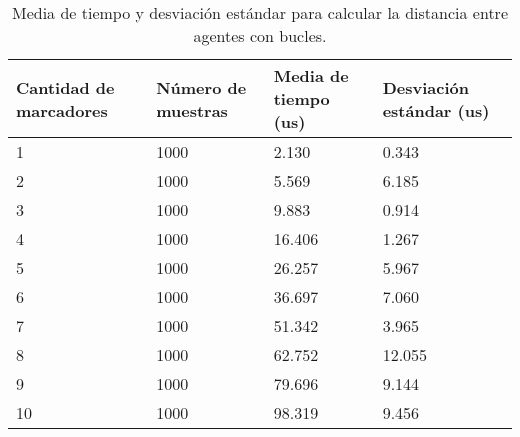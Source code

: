 \begin{table}[H]
	\centering
	\resizebox{\textwidth}{!} {
	\begin{tabular}{|l|l|l|l|}
		\hline
		\textbf{Cantidad de marcadores} & \textbf{Número de muestras} & \textbf{Media de tiempo (us)} & \textbf{Desviación estándar (us)} \\ \hline
		1                               & 1000                        & 2.130                         & 0.343                             \\ \hline
		2                               & 1000                        & 5.569                         & 6.185                             \\ \hline
		3                               & 1000                        & 9.883                         & 0.914                             \\ \hline
		4                               & 1000                        & 16.406                        & 1.267                             \\ \hline
		5                               & 1000                        & 26.257                        & 5.967                             \\ \hline
		6                               & 1000                        & 36.697                        & 7.060                             \\ \hline
		7                               & 1000                        & 51.342                        & 3.965                             \\ \hline
		8                               & 1000                        & 62.752                        & 12.055                            \\ \hline
		9                               & 1000                        & 79.696                        & 9.144                             \\ \hline
		10                              & 1000                        & 98.319                        & 9.456                             \\ \hline
	\end{tabular}}
	\caption{Media de tiempo y desviación estándar para calcular la distancia entre agentes con bucles.}
	\label{cuadro:tiempos_distancias_for}
\end{table}

